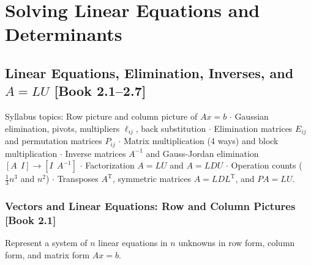 \documentclass[11pt,a4paper,openany,oneside]{book}
\def\vect#1{#1}%
\def\mathbf#1{#1}%
\def\bk#1{ [Book #1]}%
\newcommand{\vect}[1]{\mathbf{#1}}
\newcommand{\T}{\mathrm{T}}
\numberwithin{equation}{chapter}
\newcommand{\bk}[1]{\texorpdfstring{\enspace{\normalfont\small\color{slate}[Book #1]}}{ [Book #1]}}
\begin{document}
\part{Solving Linear Equations and Determinants}

\chapter[Linear Equations, Elimination, Inverses, and $A=LU$ (2.1--2.7)]{Linear Equations, Elimination, Inverses, and $A=LU$\bk{2.1--2.7}}

\begin{syll}
Syllabus topics: Row picture and column picture of $A\vect{x}=\vect{b}$ $\cdot$ Gaussian elimination, pivots, multipliers $\ell_{ij}$, back substitution $\cdot$ Elimination matrices $E_{ij}$ and permutation matrices $P_{ij}$ $\cdot$ Matrix multiplication (4 ways) and block multiplication $\cdot$ Inverse matrices $A^{-1}$ and Gauss-Jordan elimination $[A \ \ I] \to [I \ \ A^{-1}]$ $\cdot$ Factorization $A=LU$ and $A=LDU$ $\cdot$ Operation counts ($\frac{1}{3}n^3$ and $n^2$) $\cdot$ Transposes $A^\T$, symmetric matrices $A=LDL^\T$, and $PA=LU$.
\end{syll}

\section{Vectors and Linear Equations: Row and Column Pictures\bk{2.1}}

\begin{goal}
Represent a system of $n$ linear equations in $n$ unknowns in row form, column form, and matrix form $A\vect{x}=\vect{b}$.
\end{goal}
\end{document}
